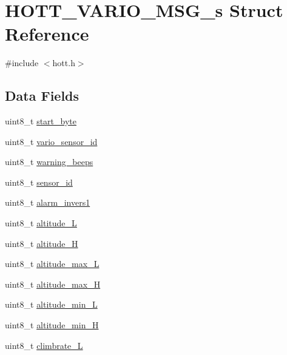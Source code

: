 \hypertarget{structHOTT__VARIO__MSG__s}{\section{H\+O\+T\+T\+\_\+\+V\+A\+R\+I\+O\+\_\+\+M\+S\+G\+\_\+s Struct Reference}
\label{structHOTT__VARIO__MSG__s}
}


{\ttfamily \#include $<$hott.\+h$>$}

\subsection*{Data Fields}
\begin{DoxyCompactItemize}
\item 
uint8\+\_\+t \hyperlink{structHOTT__VARIO__MSG__s_a39fddb920171592ba0385051f8afd4b3}{start\+\_\+byte}
\item 
uint8\+\_\+t \hyperlink{structHOTT__VARIO__MSG__s_a4e8f587d1f73db0c5c45d5a5bc13ccdf}{vario\+\_\+sensor\+\_\+id}
\item 
uint8\+\_\+t \hyperlink{structHOTT__VARIO__MSG__s_a9c9ff6efea01460a26680cec81c1bd06}{warning\+\_\+beeps}
\item 
uint8\+\_\+t \hyperlink{structHOTT__VARIO__MSG__s_ae27d44e3854d95933c56f6676e0b169d}{sensor\+\_\+id}
\item 
uint8\+\_\+t \hyperlink{structHOTT__VARIO__MSG__s_a48761131b63d99f458c34ebb891f237e}{alarm\+\_\+invers1}
\item 
uint8\+\_\+t \hyperlink{structHOTT__VARIO__MSG__s_a622d8c02691ef015703202efeab5a6bb}{altitude\+\_\+\+L}
\item 
uint8\+\_\+t \hyperlink{structHOTT__VARIO__MSG__s_a44c31c92a5a3a625b89668b541a33ea7}{altitude\+\_\+\+H}
\item 
uint8\+\_\+t \hyperlink{structHOTT__VARIO__MSG__s_a435a0f87bdc4d4aeb0fddc9d3b714d95}{altitude\+\_\+max\+\_\+\+L}
\item 
uint8\+\_\+t \hyperlink{structHOTT__VARIO__MSG__s_a5fed8b1719522984dc3459e78ed5fd7f}{altitude\+\_\+max\+\_\+\+H}
\item 
uint8\+\_\+t \hyperlink{structHOTT__VARIO__MSG__s_ac05b2afb6d5bb885fb01b73e3479b2b2}{altitude\+\_\+min\+\_\+\+L}
\item 
uint8\+\_\+t \hyperlink{structHOTT__VARIO__MSG__s_a3d39717e4510e375413ef3fb924a5629}{altitude\+\_\+min\+\_\+\+H}
\item 
uint8\+\_\+t \hyperlink{structHOTT__VARIO__MSG__s_aedd6e95e8c07bf187f9ac27c68b378dd}{climbrate\+\_\+\+L}

\end{DoxyCompactItemize}
